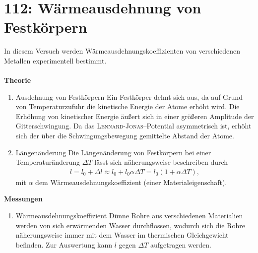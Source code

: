 \newpage
\section{112: Wärmeausdehnung von Festkörpern}
In diesem Versuch werden Wärmeausdehnungskoeffizienten von verschiedenen Metallen experimentell bestimmt.\\\\
\textbf{Theorie} 
\begin{enumerate}[label=--]
        \item Ausdehnung von Festkörpern \hspace{25pt} 
                Ein Festkörper dehnt sich aus, da auf Grund von Temperaturzufuhr die kinetische Energie der Atome erhöht wird. Die Erhöhung von kinetischer Energie äußert sich in einer größeren Amplitude der Gitterschwingung. 
                Da das \textsc{Lennard-Jonas}--Potential asymmetrisch ist, erhöht sich der über die Schwingungsbewegung gemittelte Abstand der Atome.
        \item Längenänderung \hspace{25pt} 
                Die Längenänderung von Festkörpern bei einer Temperaturänderung $\Delta T$ lässt sich näherungsweise beschreiben durch
                \begin{align} 
                        l=l_0+\Delta l \approx l_0+l_0\alpha \Delta T=l_0\left(1+\alpha \Delta T\right)
                ,\end{align} 
                mit $\alpha $ dem Wärmeausdehnungskoeffizient (einer Materialeigenschaft).
\end{enumerate}
\textbf{Messungen} 
\begin{enumerate}[label=--]
        \item Wärmeausdehnungskoeffizient \hspace{25pt} 
                Dünne Rohre aus verschiedenen Materialien werden von sich erwärmenden Wasser durchflossen, wodurch sich die Rohre näherungsweise immer mit dem Wasser im thermischen Gleichgewicht befinden.
                Zur Auswertung kann $l$ gegen $\Delta T$ aufgetragen werden.
\end{enumerate}
